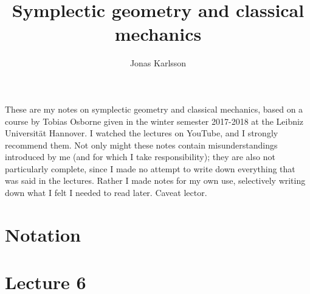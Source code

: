 \documentclass[11pt]{article} %
\title{Symplectic geometry and classical mechanics}
\author{Jonas Karlsson}
\begin{document}
\maketitle
These are my notes on symplectic geometry and classical mechanics, based on a course by Tobias Osborne given in the winter semester 2017-2018 at the Leibniz Universität Hannover. I watched the lectures on YouTube, and I strongly recommend them. Not only might these notes contain misunderstandings introduced by me (and for which I take responsibility); they are also not particularly complete, since I made no attempt to write down everything that was said in the lectures. Rather I made notes for my own use, selectively writing down what I felt I needed to read later. Caveat lector.

\section*{Notation}

\section*{}

\section*{}

\section*{}

\section*{Lecture 6}

\section*{}
\end{document}
